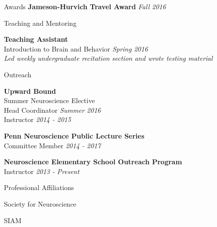 \documentclass{resume} %
\begin{document}
\begin{rSection}{Awards}
    \textbf{Jameson-Hurvich Travel Award} \hfill \emph{Fall 2016} \\
\end{rSection}


\begin{rSection}{Teaching and Mentoring}

\textbf{Teaching Assistant} \\
Introduction to Brain and Behavior \hfill \emph{Spring 2016} \\
\emph{Led weekly undergraduate recitation section and wrote testing material}
\end{rSection}


\begin{rSection}{Outreach}

\textbf{Upward Bound}\\
Summer Neuroscience Elective \\
Head Coordinator \hfill \emph{Summer 2016} \\
Instructor \hfill \emph{2014 - 2015}

\textbf{Penn Neuroscience Public Lecture Series}\\
Committee Member \hfill \emph{2014 - 2017}

\textbf{Neuroscience Elementary School Outreach Program}\\
Instructor \hfill \emph{2013 - Present}

\end{rSection}


\begin{rSection}{Professional Affiliations}

Society for Neuroscience

SIAM

\end{rSection}
\end{document}
